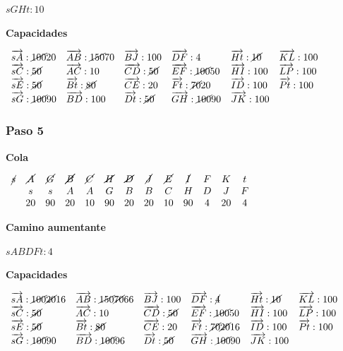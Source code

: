 \documentclass[10pt,a4paper]{article}
\begin{document}
\textbf{$sGHt:10$}

\textbf{Capacidades}

$\begin{array}{llllll} \overrightarrow{sA}: \cancel{100}20& \overrightarrow{AB}: \cancel{150} 70&\overrightarrow{BJ}: 100&\overrightarrow{DF}: 4&\overrightarrow{Ht}: \cancel{10}&\overrightarrow{KL}: 100\\ \overrightarrow{sC}: \cancel{50}& \overrightarrow{AC}: 10&\overrightarrow{CD}: \cancel{50}&\overrightarrow{EF}: \cancel{100}50&\overrightarrow{HI}: 100&\overrightarrow{LP}: 100\\ \overrightarrow{sE}: \cancel{50}& \overrightarrow{Bt}: \cancel{80}&\overrightarrow{CE}: 20&\overrightarrow{Ft}: \cancel{70}20&\overrightarrow{ID}: 100&\overrightarrow{Pt}: 100\\ \overrightarrow{sG}: \cancel{100}90& \overrightarrow{BD}: 100&\overrightarrow{Dt}: \cancel{50}&\overrightarrow{GH}: \cancel{100}90&\overrightarrow{JK}: 100&\\ \end{array}$

\subsubsection*{Paso 5}

\textbf{Cola}

$\begin{array}{ccccccccccccc} \cancel{s} & \cancel{A} & \cancel{G} &\cancel{B} & \cancel{C} & \cancel{H} & \cancel{D} & \cancel{J} &\cancel{E} & \cancel{I} & F & K & t\\ & s & s & A &A & G & B &B & C &H & D &J &F\\ & 20 & 90 & 20 & 10&90 &20 &20 &10 & 90 & 4 & 20 & 4 \end{array}$

\textbf{Camino aumentante}

$sABDFt:4$

\textbf{Capacidades}

$\begin{array}{llllll} \overrightarrow{sA}: \cancel{100}\cancel{20}16& \overrightarrow{AB}: \cancel{150} \cancel{70}66&\overrightarrow{BJ}: 100&\overrightarrow{DF}: \cancel{4}&\overrightarrow{Ht}: \cancel{10}&\overrightarrow{KL}: 100\\ \overrightarrow{sC}: \cancel{50}& \overrightarrow{AC}: 10&\overrightarrow{CD}: \cancel{50}&\overrightarrow{EF}: \cancel{100}50&\overrightarrow{HI}: 100&\overrightarrow{LP}: 100\\ \overrightarrow{sE}: \cancel{50}& \overrightarrow{Bt}: \cancel{80}&\overrightarrow{CE}: 20&\overrightarrow{Ft}: \cancel{70}\cancel{20}16&\overrightarrow{ID}: 100&\overrightarrow{Pt}: 100\\ \overrightarrow{sG}: \cancel{100}90& \overrightarrow{BD}: \cancel{100}96&\overrightarrow{Dt}: \cancel{50}&\overrightarrow{GH}: \cancel{100}90&\overrightarrow{JK}: 100&\\ \end{array}$
\end{document}
